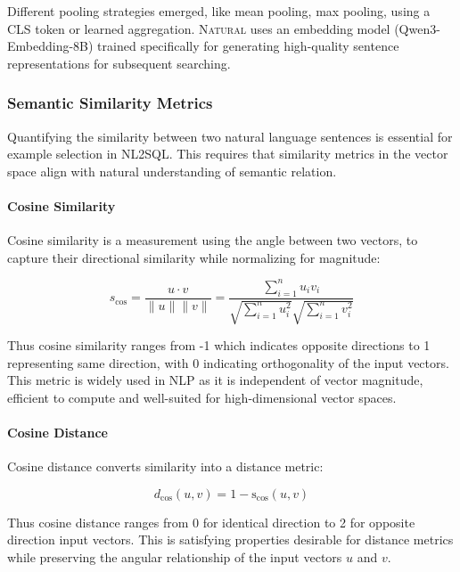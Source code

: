 Different pooling strategies emerged, like mean pooling, max
pooling, using a CLS token or learned aggregation. \textsc{Natural} uses
an embedding model (Qwen3-Embedding-8B) trained specifically for generating
high-quality sentence representations for subsequent searching.

\subsubsection{Semantic Similarity Metrics}

Quantifying the similarity between two natural language sentences is essential
for example selection in NL2SQL. This requires that similarity metrics in the
vector space align with natural understanding of semantic relation.

\paragraph{Cosine Similarity}

Cosine similarity is a measurement using the angle between two vectors,
to capture their directional similarity while normalizing for magnitude:

\begin{equation}
s_{\cos} = \frac{u \cdot v}{\|u\| \|v\|} = \frac{\displaystyle\sum_{i=1}^n u_i v_i}{\sqrt{\displaystyle\sum_{i=1}^n u_i^2} \sqrt{\displaystyle\sum_{i=1}^n v_i^2}}
\end{equation}

Thus cosine similarity ranges from -1 which indicates opposite directions to 1
representing same direction, with 0 indicating orthogonality of the input
vectors. This metric is widely used in NLP as it is independent of vector
magnitude, efficient to compute and well-suited for high-dimensional vector
spaces. 

\paragraph{Cosine Distance}

Cosine distance converts similarity into a distance metric:

\begin{equation}
d_{\cos}(u, v) = 1 - \text{s}_{\cos}(u, v)
\end{equation}

Thus cosine distance ranges from 0 for identical direction to 2 for opposite
direction input vectors. This is satisfying properties desirable for distance
metrics while preserving the angular relationship of the input vectors $u$ and
$v$.
